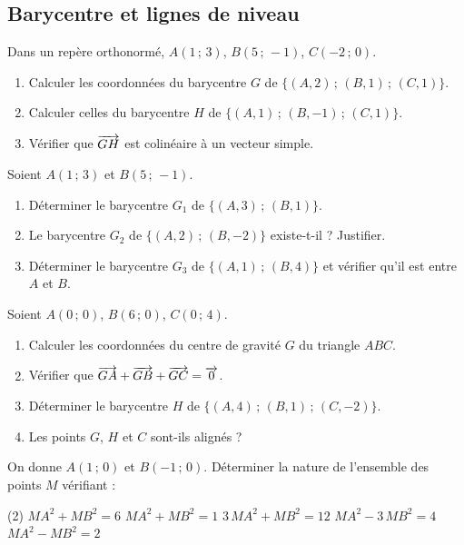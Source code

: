 \subsection{Barycentre et lignes de niveau}

Dans un repère orthonormé, $A(1\,;\,3)$, $B(5\,;\,-1)$, $C(-2\,;\,0)$.
\begin{enumerate}
	\item Calculer les coordonnées du barycentre $G$ de $\{(A,2)\,;\,(B,1)\,;\,(C,1)\}$.
	\item Calculer celles du barycentre $H$ de $\{(A,1)\,;\,(B,-1)\,;\,(C,1)\}$.
	\item Vérifier que $\overrightarrow{GH}$ est colinéaire à un vecteur simple.
\end{enumerate}

Soient $A(1\,;\,3)$ et $B(5\,;\,-1)$.
\begin{enumerate}
	\item Déterminer le barycentre $G_1$ de $\{(A,3)\,;\,(B,1)\}$.
	\item Le barycentre $G_2$ de $\{(A,2)\,;\,(B,-2)\}$ existe-t-il ? Justifier.
	\item Déterminer le barycentre $G_3$ de $\{(A,1)\,;\,(B,4)\}$ et vérifier
	qu'il est entre $A$ et $B$.
\end{enumerate}

Soient $A(0\,;\,0)$, $B(6\,;\,0)$, $C(0\,;\,4)$.
\begin{enumerate}
	\item Calculer les coordonnées du centre de gravité $G$ du triangle $ABC$.
	\item Vérifier que $\overrightarrow{GA} + \overrightarrow{GB} + \overrightarrow{GC} = \overrightarrow{0}$.
	\item Déterminer le barycentre $H$ de $\{(A,4)\,;\,(B,1)\,;\,(C,-2)\}$.
	\item Les points $G$, $H$ et $C$ sont-ils alignés ?
\end{enumerate}

On donne $A(1\,;\,0)$ et $B(-1\,;\,0)$. Déterminer la nature de l'ensemble des
points $M$ vérifiant :
\begin{listecol}(2)
	\task $MA^2 + MB^2 = 6$
	\task $MA^2 + MB^2 = 1$
	\task $3\,MA^2 + MB^2 = 12$
	\task $MA^2 - 3\,MB^2 = 4$
	\task $MA^2 - MB^2 = 2$
\end{listecol}

